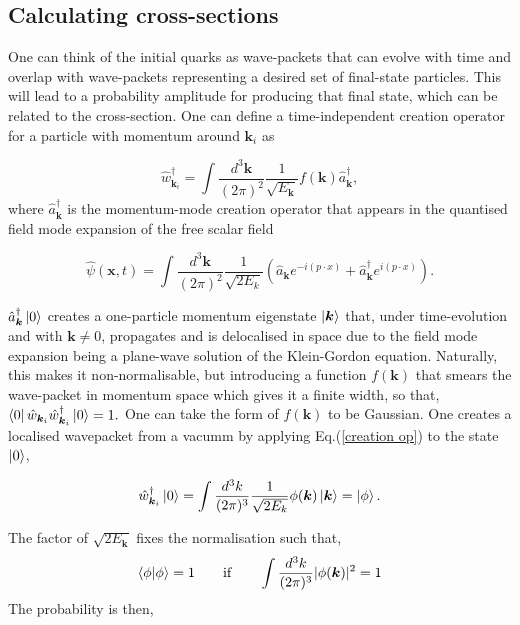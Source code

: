 \documentclass[a4paper,11pt]{article}
\begin{document}
\subsection{Calculating cross-sections}
One can think of the initial quarks as wave-packets that can evolve with time and overlap with wave-packets representing a desired set of final-state particles. This will lead to a probability amplitude for producing that final state, which can be related to the cross-section. One can define a time-independent creation operator for a particle with momentum around $\boldsymbol{k}_i$ as

\begin{equation}\label{creation op}
	\hat{w}_{\boldsymbol{k}_i}^\dagger = \int \frac{d^3\boldsymbol{k}}{(2\pi)^2}\frac{1}{\sqrt{E_{\boldsymbol{k}}}}  f(\boldsymbol{k})\hat{a}_{\boldsymbol{k}}^\dagger,
\end{equation}
where $\hat{a}_{\boldsymbol{k}}^\dagger$ is the momentum-mode creation operator that appears in the quantised field mode expansion of the free scalar field

 $$\hat{\psi}(\boldsymbol{x},t) = \int \frac{d^3 \boldsymbol{k}}{(2\pi)^2}\frac{1}{\sqrt{2E_k}}(\hat{a}_{\boldsymbol{k}}e^{-i(p\cdot x)} + \hat{a}_{\boldsymbol{k}}^\dagger e^{i(p\cdot x)}).$$

$\hat{a}_{\boldsymbol{k}}^\dagger \ket{0}$ creates a one-particle momentum eigenstate $\ket{\boldsymbol{k}}$ that, under time-evolution and with  $\boldsymbol{k} \neq 0$, propagates and is delocalised in space due to the field mode expansion being a plane-wave solution of the Klein-Gordon equation. Naturally, this makes it non-normalisable, but introducing a function $f(\boldsymbol{k})$ that smears the wave-packet in momentum space which gives it a finite width, so that, $\bra{0}\hat{w}_{\boldsymbol{k}_i}\hat{w}_{\boldsymbol{k}_i}^\dagger\ket{0}=1.$ One can take the form of $f(\boldsymbol{k})$ to be Gaussian. One creates a localised wavepacket from a vacumm by applying Eq.(\ref{creation op}) to the state $\ket{0}$,

$$\hat{w}_{\boldsymbol{k}_i}^\dagger\ket{0} = \int \frac{d^3 k}{(2\pi)^3}\frac{1}{\sqrt{2E_k}}\phi(\boldsymbol{k})\ket{\boldsymbol{k}} = \ket{\phi}. $$

The factor of $\sqrt{2E_{\boldsymbol{k}}}$ fixes the normalisation such that,
\begin{equation}\label{normalisation}
	\bra{\phi}\ket{\phi} = 1 \qquad \text{if} \qquad \int\frac{d^3k}{(2\pi)^3}|\phi(\boldsymbol{k})|^2 = 1
\end{equation} 
	The probability is then, 
\end{document}
